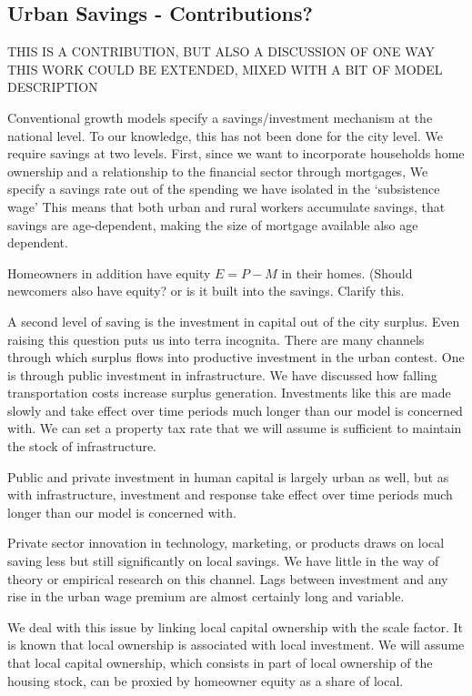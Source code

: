 \subsection{Urban Savings - Contributions?}
THIS IS A CONTRIBUTION, BUT ALSO A DISCUSSION OF ONE WAY THIS WORK COULD BE EXTENDED, MIXED WITH A BIT OF MODEL DESCRIPTION

Conventional growth models specify a savings/investment mechanism at the national level. To our knowledge, this has not been done for the city level. We require  savings at two levels. First, since we want to incorporate  households home ownership and a relationship to the financial sector through mortgages, We specify a savings rate out of the spending we have isolated in the `subsistence wage' This means that both urban and rural workers accumulate savings, that savings are age-dependent, making the size of mortgage available also age dependent. 

Homeowners in addition have equity $E=P-M$ in their homes.  ({\color{red}Should newcomers also have equity? or is it built into the savings. Clarify this.} 

A second level of saving is the  investment in capital out of the city surplus. Even raising this question puts us into terra incognita. There are many  channels through which surplus flows into productive investment in the urban contest. One is through public investment in infrastructure. We have discussed how falling transportation costs increase surplus generation. Investments like this are made slowly and take effect over time periods much longer than our model is concerned with.  We can set a property tax rate   that we will assume is sufficient to maintain the stock of infrastructure.

Public and private investment in human capital is largely urban as well, but as with infrastructure, investment and response take effect over time periods much longer than our model is concerned with. 

Private sector innovation in technology, marketing, or products draws on local saving less but still significantly on local savings. We have little in the way of theory or empirical research on this channel. Lags between investment and any rise in the urban wage premium are almost certainly long and variable. 

We deal with this issue by linking local capital ownership with the scale factor. It is known that local ownership is associated with local investment. We will assume that local capital ownership, which consists in part of local ownership of the housing stock, can be proxied by homeowner equity as a share of local. 

